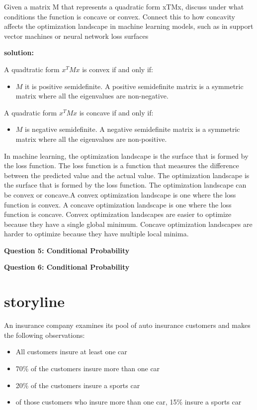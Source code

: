\documentclass{article}
\begin{document}
Given a matrix M that represents a quadratic form xTMx, discuss under what conditions the function is
concave or convex. Connect this to how concavity affects the optimization landscape in machine learning
models, such as in support vector machines or neural network loss surfaces

\textbf{solution:}

A quadtratic form \(x^T M  x\) is convex if and only if:\newline

\begin{itemize}
    \item \(M\) it is positive semidefinite. A positive semidefinite matrix is a symmetric matrix where all the eigenvalues are non-negative.\newline
\end{itemize}

A quadratic form \(x^T M  x\) is concave if and only if:\newline
\begin{itemize}
    \item \(M\) is negative semidefinite. A negative semidefinite matrix is a symmetric matrix where all the eigenvalues are non-positive.\newline
\end{itemize}

In machine learning, the optimization landscape is the surface that is formed by the loss function. The loss function is a function that measures the difference between the predicted value and the actual value. The optimization landscape is the surface that is formed by the loss function. The optimization landscape can be convex or concave.\newline A convex optimization landscape is one where the loss function is convex. A concave optimization landscape is one where the loss function is concave. Convex optimization landscapes are easier to optimize because they have a single global minimum. Concave optimization landscapes are harder to optimize because they have multiple local minima. 


\begin{center}
    \large \textbf{Question 5: Conditional Probability}
\end{center}


\begin{center}
    \large \textbf{Question 6: Conditional Probability}
\end{center}
\section{storyline}
An insurance company examines its pool of auto insurance customers and makes the following observations:
\begin{itemize}
    \item All customers insure at least one car
    \item 70\% of the customers insure more than one car
    \item 20\% of the customers insure a sports car
    \item of those customers who insure more than one car, 15\% insure a sports car
\end{itemize}
\end{document}
